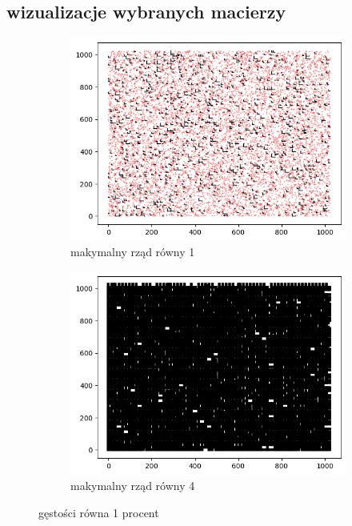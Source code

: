 \documentclass{article}
\begin{document}
\subsection{wizualizacje wybranych macierzy}
\FloatBarrier
\begin{figure}[htbp]
  \centering
  \begin{subfigure}[b]{0.4\textwidth}
      \includegraphics[width=\linewidth]{img/1proc.png}
      \caption{makymalny rząd równy 1}
      \label{fig:obraz1}
  \end{subfigure}
  \hfill
  \begin{subfigure}[b]{0.4\textwidth}
      \includegraphics[width=\linewidth]{img/1proc4.png}
      \caption{makymalny rząd równy 4}
      \label{fig:obraz2}
  \end{subfigure}
  \caption{gęstości równa 1 procent}
  \label{fig:zestaw_obrazkow}
\end{figure}
\end{document}
